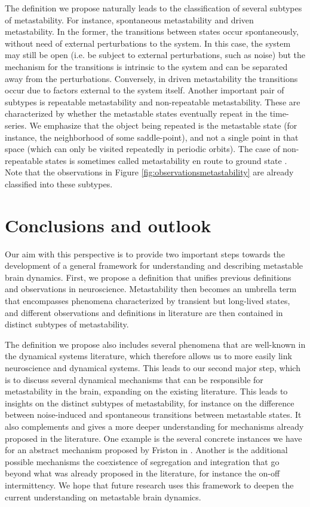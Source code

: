 \documentclass[reprint,onecolumn,superscriptaddress,showpacs,amsmath,amssymb,aps,floatfix]{revtex4-2}
\theoremstyle{definition}
\begin{document}
The definition we propose naturally leads to the classification of several subtypes of metastability. For instance, spontaneous metastability and driven metastability. In the former, the transitions between states occur spontaneously, without need of external perturbations to the system. In this case, the system may still be open (i.e. be subject to external perturbations, such as noise) but the mechanism for the transitions is intrinsic to the system and can be separated away from the perturbations. Conversely, in driven metastability the transitions occur due to factors external to the system itself. Another important pair of subtypes is repeatable metastability and non-repeatable metastability. These are characterized by whether the metastable states eventually repeat in the time-series. We emphasize that the object being repeated is the metastable state (for instance, the neighborhood of some saddle-point), and not a single point in that space (which can only be visited repeatedly in periodic orbits). The case of non-repeatable states is sometimes called metastability en route to ground state \cite{brinkman2022metastable}. Note that the observations in Figure \ref{fig:observationsmetastability} are already classified into these subtypes. 

\section{Conclusions and outlook}
Our aim with this perspective is to provide two important steps towards the development of a general framework for understanding and describing metastable brain dynamics. First, we propose a definition that unifies previous definitions and observations in neuroscience. Metastability then becomes an umbrella term that encompasses phenomena characterized by transient but long-lived states, and different observations and definitions in literature are then contained in distinct subtypes of metastability. 

The definition we propose also includes several phenomena that are well-known in the dynamical systems literature, which therefore allows us to more easily link neuroscience and dynamical systems. This leads to our second major step, which is to discuss several dynamical mechanisms that can be responsible for metastability in the brain, expanding on the existing literature. This leads to insights on the distinct subtypes of metastability, for instance on the difference between noise-induced and spontaneous transitions between metastable states. It also complements and gives a more deeper understanding for mechanisms already proposed in the literature. One example is the several concrete instances we have for an abstract mechanism proposed by Friston in \cite{friston2000transients}. Another is the additional possible mechanisms the coexistence of segregation and integration that go beyond what was already proposed in the literature, for instance the on-off intermittency. We hope that future research uses this framework to deepen the current understanding on metastable brain dynamics.
\end{document}

